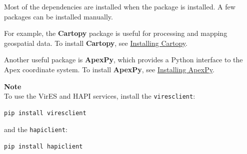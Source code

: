 Most of the dependencies are installed when the package is installed. A few packages can be installed manually.

For example, the \textbf{Cartopy} package is useful for processing and mapping geospatial data. To install \textbf{Cartopy}, see \href{https://cartopy.readthedocs.io/stable/installing.html}{Installing Cartopy}.

Another useful package is \textbf{ApexPy}, which provides a Python interface to the Apex coordinate system. To install \textbf{ApexPy}, see \href{https://apexpy.readthedocs.io/en/latest/installation.html}{Installing ApexPy}.

\begin{framed}
\textbf{Note}\\
To use the VirES and HAPI services, install the \texttt{viresclient}:

\begin{verbatim}
pip install viresclient
\end{verbatim}

and the \texttt{hapiclient}:

\begin{verbatim}
pip install hapiclient
\end{verbatim}
\end{framed}